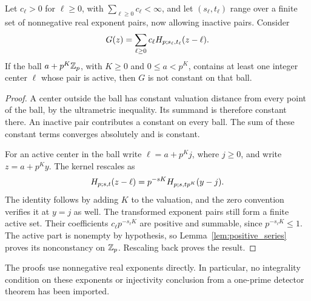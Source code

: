 \begin{lemma}\label{lem:local}
Let $c_\ell>0$ for $\ell\geq0$, with $\sum_{\ell\geq0}c_\ell<\infty$,
and let $(s_\ell,t_\ell)$ range over a finite set of nonnegative real
exponent pairs, now allowing inactive pairs. Consider
\[
 G(z)=\sum_{\ell\geq0}c_\ell H_{p;s_\ell,t_\ell}(z-\ell).
\]
If the ball $a+p^K\mathbb Z_p$, with $K\geq0$ and $0\leq a<p^K$, contains
at least one integer center $\ell$ whose pair is active, then $G$ is
not constant on that ball.
\end{lemma}

\begin{proof}
A center outside the ball has constant valuation distance from every
point of the ball, by the ultrametric inequality. Its summand is therefore
constant there. An inactive pair contributes a constant on every ball.
The sum of these constant terms converges absolutely and is constant.

For an active center in the ball write $\ell=a+p^Kj$, where $j\geq0$,
and write $z=a+p^Ky$. The kernel rescales as
\begin{equation}\label{eq:local_rescaling}
 H_{p;s,t}(z-\ell)
   =p^{-sK}H_{p;s,tp^K}(y-j).
\end{equation}
The identity follows by adding $K$ to the valuation, and the zero
convention verifies it at $y=j$ as well. The transformed exponent pairs
still form a finite active set. Their coefficients $c_\ell p^{-s_\ell K}$
are positive and summable, since $p^{-s_\ell K}\leq1$.
The active part is nonempty by hypothesis, so
Lemma~\ref{lem:positive_series} proves its nonconstancy on $\mathbb Z_p$.
Rescaling back proves the result.
\end{proof}

The proofs use nonnegative real exponents directly. In particular, no
integrality condition on these exponents or injectivity conclusion from a
one-prime detector theorem has been imported.
